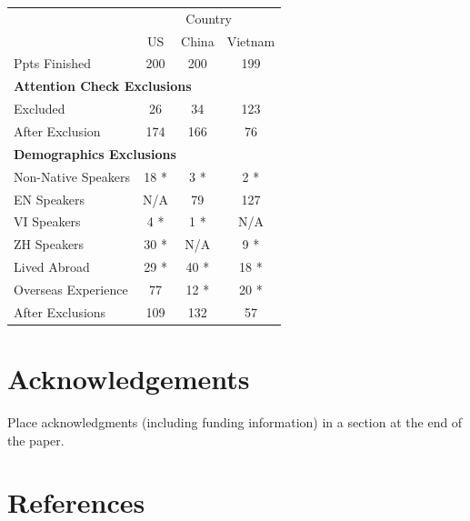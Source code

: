 \documentclass[10pt, letterpaper]{article}
\begin{document}
\begin{tabular}[t]{l|c|c|c}
\hline
\multicolumn{1}{c|}{ } & \multicolumn{3}{c}{Country} \\
\cline{2-4}
  & US & China & Vietnam\\
\hline
Ppts Finished & 200 & 200 & 199\\
\hline
\multicolumn{4}{l}{\textbf{Attention Check Exclusions}}\\
\hline
\hspace{1em}Excluded & 26 & 34 & 123\\
\hline
\hspace{1em}After Exclusion & 174 & 166 & 76\\
\hline
\multicolumn{4}{l}{\textbf{Demographics Exclusions}}\\
\hline
\hspace{1em}Non-Native Speakers & 18 * & 3 * & 2 *\\
\hline
\hspace{1em}EN Speakers & N/A & 79 & 127\\
\hline
\hspace{1em}VI Speakers & 4 * & 1 * & N/A\\
\hline
\hspace{1em}ZH Speakers & 30 * & N/A & 9 *\\
\hline
\hspace{1em}Lived Abroad & 29 * & 40 * & 18 *\\
\hline
\hspace{1em}Overseas Experience & 77 & 12 * & 20 *\\
\hline
\hspace{1em}After Exclusions & 109 & 132 & 57\\
\hline
\end{tabular}

\newpage

\hypertarget{acknowledgements}{%
\section{Acknowledgements}\label{acknowledgements}}

Place acknowledgments (including funding information) in a section at
the end of the paper.

\hypertarget{references}{%
\section{References}\label{references}}

\setlength{\parindent}{-0.1in} 
\setlength{\leftskip}{0.125in}
\end{document}
